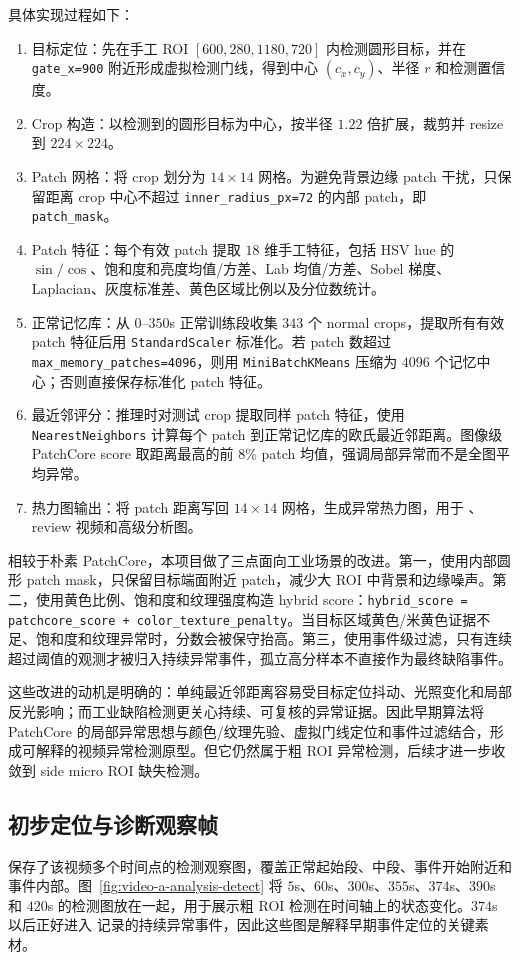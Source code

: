 \documentclass[a4paper,12pt]{article}
\newcommand{\code}[1]{\texttt{#1}}
\begin{document}
具体实现过程如下：
\begin{enumerate}[label=\arabic*.]
    \item 目标定位：先在手工 ROI $[600,280,1180,720]$ 内检测圆形目标，并在 \code{gate\_x=900} 附近形成虚拟检测门线，得到中心 $(c_x,c_y)$、半径 $r$ 和检测置信度。
    \item Crop 构造：以检测到的圆形目标为中心，按半径 $1.22$ 倍扩展，裁剪并 resize 到 $224\times224$。
    \item Patch 网格：将 crop 划分为 $14\times14$ 网格。为避免背景边缘 patch 干扰，只保留距离 crop 中心不超过 \code{inner\_radius\_px=72} 的内部 patch，即 \code{patch\_mask}。
    \item Patch 特征：每个有效 patch 提取 $18$ 维手工特征，包括 HSV hue 的 $\sin/\cos$、饱和度和亮度均值/方差、Lab 均值/方差、Sobel 梯度、Laplacian、灰度标准差、黄色区域比例以及分位数统计。
    \item 正常记忆库：从 $0$--$350$s 正常训练段收集 $343$ 个 normal crops，提取所有有效 patch 特征后用 \code{StandardScaler} 标准化。若 patch 数超过 \code{max\_memory\_patches=4096}，则用 \code{MiniBatchKMeans} 压缩为 $4096$ 个记忆中心；否则直接保存标准化 patch 特征。
    \item 最近邻评分：推理时对测试 crop 提取同样 patch 特征，使用 \code{NearestNeighbors} 计算每个 patch 到正常记忆库的欧氏最近邻距离。图像级 PatchCore score 取距离最高的前 $8\%$ patch 均值，强调局部异常而不是全图平均异常。
    \item 热力图输出：将 patch 距离写回 $14\times14$ 网格，生成异常热力图，用于 、review 视频和高级分析图。
\end{enumerate}

相较于朴素 PatchCore，本项目做了三点面向工业场景的改进。第一，使用内部圆形 patch mask，只保留目标端面附近 patch，减少大 ROI 中背景和边缘噪声。第二，使用黄色比例、饱和度和纹理强度构造 hybrid score：\code{hybrid\_score = patchcore\_score + color\_texture\_penalty}。当目标区域黄色/米黄色证据不足、饱和度和纹理异常时，分数会被保守抬高。第三，使用事件级过滤，只有连续超过阈值的观测才被归入持续异常事件，孤立高分样本不直接作为最终缺陷事件。

这些改进的动机是明确的：单纯最近邻距离容易受目标定位抖动、光照变化和局部反光影响；而工业缺陷检测更关心持续、可复核的异常证据。因此早期算法将 PatchCore 的局部异常思想与颜色/纹理先验、虚拟门线定位和事件过滤结合，形成可解释的视频异常检测原型。但它仍然属于粗 ROI 异常检测，后续才进一步收敛到 side micro ROI 缺失检测。

\subsection{初步定位与诊断观察帧}
 保存了该视频多个时间点的检测观察图，覆盖正常起始段、中段、事件开始附近和事件内部。图~\ref{fig:video-a-analysis-detect} 将 $5$s、$60$s、$300$s、$355$s、$374$s、$390$s 和 $420$s 的检测图放在一起，用于展示粗 ROI 检测在时间轴上的状态变化。$374$s 以后正好进入  记录的持续异常事件，因此这些图是解释早期事件定位的关键素材。
\end{document}

